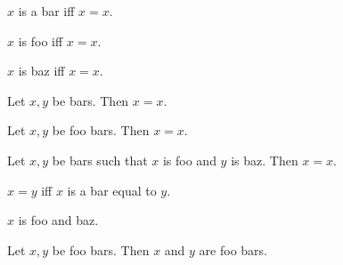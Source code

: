 \begin{definition}\label{bar}
    $x$ is a bar iff $x = x$.
\end{definition}

\begin{definition}\label{foo}
    $x$ is foo iff $x = x$.
\end{definition}

\begin{definition}\label{baz}
    $x$ is baz iff $x = x$.
\end{definition}

\begin{proposition}\label{nouns}
    Let $x, y$ be bars.
    Then $x = x$.
\end{proposition}

\begin{proposition}\label{adj_nouns}
    Let $x, y$ be foo bars.
    Then $x = x$.
\end{proposition}


\begin{proposition}\label{nouns_suchthat}
    Let $x, y$ be bars such that $x$ is foo and $y$ is baz.
    Then $x = x$.
\end{proposition}


\begin{proposition}\label{noun_verb}
    $x = y$ iff $x$ is a bar equal to $y$.
\end{proposition}


\begin{proposition}\label{adjs}
    $x$ is foo and baz.
\end{proposition}

\begin{proposition}\label{are_nouns}
    Let $x, y$ be foo bars.
    Then $x$ and $y$ are foo bars.
\end{proposition}
